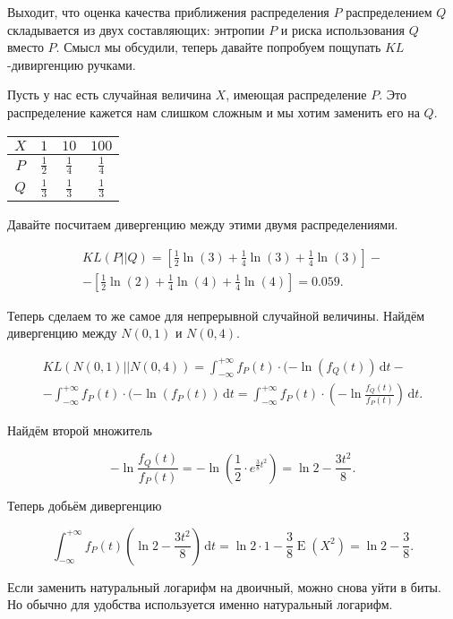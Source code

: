 \documentclass[12pt, a4paper, oneside]{extreport}
\DeclareMathOperator{\E}{\mathop{E}}
\newcommand{\dx}[1]{\,\mathrm{d}#1} %
\theoremstyle{plain}              %
\theoremstyle{definition}         %
\begin{document}
Выходит, что оценка качества приближения распределения $P$ распределением $Q$ складывается из двух составляющих: энтропии $P$ и риска использования $Q$ вместо $P$. Смысл мы обсудили, теперь давайте попробуем пощупать $KL$-дивиргенцию ручками. 

Пусть у нас есть случайная величина $X$, имеющая распределение $P$. Это распределение кажется нам слишком сложным и мы хотим заменить его на $Q$. 

\begin{center}
	\begin{tabular}{c|c|c|c}
		$X$ & $1$ & $10$  &  $100$  \\ \hline
		$P$ & $\frac{1}{2}$  & $\frac{1}{4}$   &  $\frac{1}{4}$  \\ \hline 
		$Q$  &  $\frac{1}{3}$  &  $\frac{1}{3}$  &  $\frac{1}{3}$ 
	\end{tabular}
\end{center}


Давайте посчитаем дивергенцию между этими двумя распределениями. 

\begin{multline*}
KL(P || Q) = \left[ \frac{1}{2} \ln(3) + \frac{1}{4} \ln(3) + \frac{1}{4} \ln(3) \right] - \\ -\left[ \frac{1}{2} \ln(2) + \frac{1}{4} \ln(4) + \frac{1}{4} \ln(4) \right] = 0.059.
\end{multline*}

Теперь сделаем то же самое для непрерывной случайной величины. Найдём дивергенцию между $N(0,1)$ и $N(0,4)$.

\begin{multline*}
KL(N(0,1) || N(0,4)) = \int_{-\infty}^{+\infty} f_P(t) \cdot (-\ln(f_Q(t)) \dx{t} - \\ -\int_{-\infty}^{+\infty} f_P(t) \cdot (-\ln(f_P(t)) \dx{t} = \int_{-\infty}^{+\infty} f_P(t) \cdot \left( -\ln \frac{f_Q(t)}{f_P(t)} \right) \dx{t}. 
\end{multline*}

Найдём второй множитель

\[ - \ln \frac{f_Q(t)}{f_P(t)}  = -\ln \left(\frac{1}{2} \cdot e^{\tfrac{3}{8} t^2} \right) = \ln2 - \frac{3t^2}{8}.  \]

Теперь добьём дивергенцию 

\[ \int_{-\infty}^{+\infty} f_P(t) (\ln2 - \frac{3t^2}{8}) \dx{t} = \ln2 \cdot 1 - \frac{3}{8} \E(X^2) = \ln2 - \frac{3}{8}. \]

Если заменить натуральный логарифм на двоичный, можно снова уйти в биты.  Но обычно для удобства используется именно натуральный логарифм.
\end{document}
